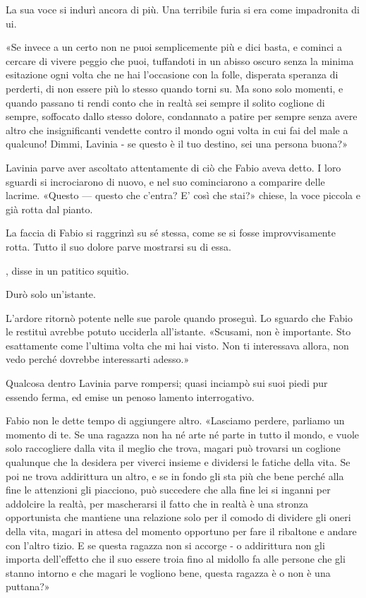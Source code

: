 La sua voce si indurì ancora di più. Una terribile furia si era come impadronita di ui.

«Se invece a un certo non ne puoi semplicemente più e dici basta, e cominci a cercare di vivere peggio che puoi, tuffandoti in un abisso oscuro senza la minima esitazione ogni volta che ne hai l'occasione con la folle, disperata speranza di perderti, di non essere più lo stesso quando torni su. Ma sono solo momenti, e quando passano ti rendi conto che in realtà sei sempre il solito coglione di sempre, soffocato dallo stesso dolore, condannato a patire per sempre senza avere altro che insignificanti vendette contro il mondo ogni volta in cui fai del male a qualcuno! Dimmi, Lavinia - se questo è il tuo destino, sei una persona buona?»

Lavinia parve aver ascoltato attentamente di ciò che Fabio aveva detto. I loro sguardi si incrociarono di nuovo, e nel suo cominciarono a comparire delle lacrime. «Questo --- questo che c'entra? E' così che stai?» chiese, la voce piccola e già rotta dal pianto.

La faccia di Fabio si raggrinzì su sé stessa, come se si fosse improvvisamente rotta. Tutto il suo dolore parve mostrarsi su di essa. 

, disse in un patitico squitìo.

Durò solo un'istante.

L'ardore ritornò potente nelle sue parole quando proseguì. Lo sguardo che Fabio le restituì avrebbe potuto ucciderla all'istante. «Scusami, non è importante. Sto esattamente come l'ultima volta che mi hai visto. Non ti interessava allora, non vedo perché dovrebbe interessarti adesso.»

Qualcosa dentro Lavinia parve rompersi; quasi inciampò sui suoi piedi pur essendo ferma, ed emise un penoso lamento interrogativo.

Fabio non le dette tempo di aggiungere altro. «Lasciamo perdere, parliamo un momento di te. Se una ragazza non ha né arte né parte in tutto il mondo, e vuole solo raccogliere dalla vita il meglio che trova, magari può trovarsi un coglione qualunque che la desidera per viverci insieme e dividersi le fatiche della vita. Se poi ne trova addirittura un altro, e se in fondo gli sta più che bene perché alla fine le attenzioni gli piacciono, può succedere che alla fine lei si inganni per addolcire la realtà, per mascherarsi il fatto che in realtà è una stronza opportunista che mantiene una relazione solo per il comodo di dividere gli oneri della vita, magari in attesa del momento opportuno per fare il ribaltone e andare con l'altro tizio. E se questa ragazza non si accorge - o addirittura non gli importa dell'effetto che il suo essere troia fino al midollo fa alle persone che gli stanno intorno e
che magari le vogliono bene, questa ragazza è o non è una puttana?»

